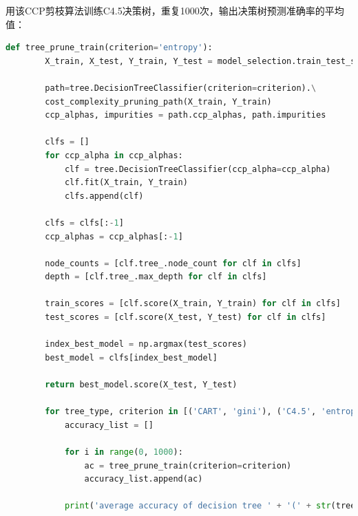\documentclass[12pt]{article}
\begin{document}
用该CCP剪枝算法训练C4.5决策树，重复1000次，输出决策树预测准确率的平均值：
\begin{lstlisting}[language=python]
	def tree_prune_train(criterion='entropy'):
		X_train, X_test, Y_train, Y_test = model_selection.train_test_split(df[data.feature_names], df['target'], test_size = 0.1)
	
		path=tree.DecisionTreeClassifier(criterion=criterion).\
		cost_complexity_pruning_path(X_train, Y_train)
		ccp_alphas, impurities = path.ccp_alphas, path.impurities
	
		clfs = []
		for ccp_alpha in ccp_alphas:
			clf = tree.DecisionTreeClassifier(ccp_alpha=ccp_alpha)
			clf.fit(X_train, Y_train)
			clfs.append(clf)
	
		clfs = clfs[:-1]
		ccp_alphas = ccp_alphas[:-1]
	
		node_counts = [clf.tree_.node_count for clf in clfs]
		depth = [clf.tree_.max_depth for clf in clfs]
	
		train_scores = [clf.score(X_train, Y_train) for clf in clfs]
		test_scores = [clf.score(X_test, Y_test) for clf in clfs]
	
		index_best_model = np.argmax(test_scores)
		best_model = clfs[index_best_model]
	
		return best_model.score(X_test, Y_test)
	
		for tree_type, criterion in [('CART', 'gini'), ('C4.5', 'entropy')]:
			accuracy_list = []
	
			for i in range(0, 1000):
				ac = tree_prune_train(criterion=criterion)
				accuracy_list.append(ac)
	
			print('average accuracy of decision tree ' + '(' + str(tree_type) + ', Cost Complexity Pruning): ' + str("%.4f" % np.mean(accuracy_list)))
\end{lstlisting}
\vbox{}
\end{document}
